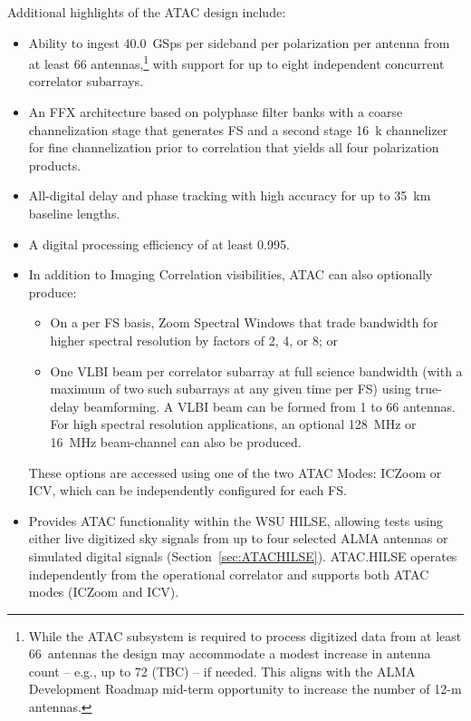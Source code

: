 \noindent Additional highlights of the \ac{ATAC} design include:

\begin{itemize}[itemsep=-0.5em]
    \item Ability to ingest 40.0~GSps per sideband per polarization per antenna from at least 66 antennas,\footnote{While the \ac{ATAC} subsystem is required to process digitized data from at least 66~antennas the design may accommodate a modest increase in antenna count -- e.g., up to 72 (TBC) -- if needed. This aligns with the ALMA Development Roadmap mid-term opportunity to increase the number of 12-m antennas.} with support for up to eight independent concurrent correlator subarrays.
    \item An FFX architecture based on polyphase filter banks with a coarse channelization stage that generates \ac{FS} and a second stage 16~k channelizer for fine channelization prior to correlation that yields all four polarization products.
    \item All-digital delay and phase tracking with high accuracy for up to 35~km baseline lengths.
    \item A digital processing efficiency of at least 0.995. 
    \item In addition to Imaging Correlation visibilities, \ac{ATAC} can also optionally produce:
   \begin{itemize}[itemsep=-0.5em]
     \item On a per \ac{FS} basis, Zoom Spectral Windows that trade bandwidth for higher spectral resolution by factors of 2, 4, or 8; or
     \item One \ac{VLBI} beam per correlator subarray at full science bandwidth (with a maximum of two such subarrays at any given time per \ac{FS}) using true-delay beamforming. A \ac{VLBI} beam can be formed from 1 to 66 antennas. For high spectral resolution applications, an optional 128~MHz or 16~MHz beam-channel can also be produced. 
   \end{itemize}
\noindent These options are accessed using one of the two \ac{ATAC} Modes: \ac{ICZoom} or \ac{ICV}, which can be independently configured for each \ac{FS}.

\item Provides \ac{ATAC} functionality within the \ac{WSU} \ac{HILSE}, allowing tests using either live digitized sky signals from up to four selected ALMA antennas or simulated digital signals (Section~\ref{sec:ATACHILSE}).
\acs{ATAC}.\acs{HILSE} operates independently from the operational correlator and supports both \ac{ATAC} modes (\ac{ICZoom} and \ac{ICV}).

\end{itemize}


